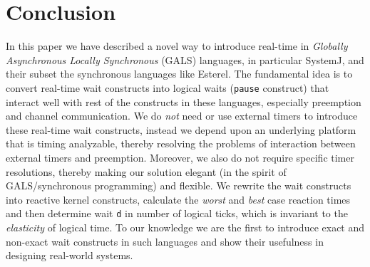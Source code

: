 \section{Conclusion}
\label{sec:concl-future-work}

In this paper we have described a novel way to introduce real-time in
\textit{Globally Asynchronous Locally Synchronous} (GALS) languages, in
particular SystemJ, and their subset the synchronous languages like
Esterel. The fundamental idea is to convert real-time wait constructs
into logical waits (\texttt{pause} construct) that interact well with
rest of the constructs in these languages, especially preemption and
channel communication. We do \textit{not} need or use external timers to
introduce these real-time wait constructs, instead we depend upon an
underlying platform that is timing analyzable, thereby resolving the
problems of interaction between external timers and
preemption. Moreover, we also do not require specific timer resolutions,
thereby making our solution elegant (in the spirit of GALS/synchronous
programming) and flexible. We rewrite the wait constructs into reactive
kernel constructs, calculate the \textit{worst} and \textit{best} case
reaction times and then determine wait \texttt{d} in number of logical
ticks, which is invariant to the \textit{elasticity} of logical time. To
our knowledge we are the first to introduce exact and non-exact wait
constructs in such languages and show their usefulness in designing
real-world systems.


